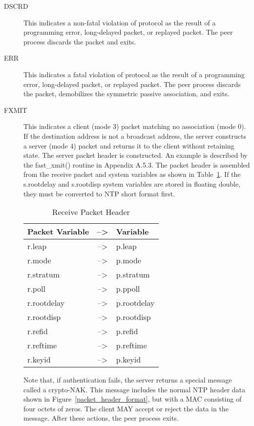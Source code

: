 \begin{description}

  \item[DSCRD] This indicates a non-fatal violation of protocol as the
    result of a programming error, long-delayed packet, or replayed
    packet. The peer process discards the packet and exits.

  \item[ERR] This indicates a fatal violation of protocol as the result of a
    programming error, long-delayed packet, or replayed packet. The peer
    process discards the packet, demobilizes the symmetric passive
    association, and exits.

  \item[FXMIT] This indicates a client (mode 3) packet matching no
    association (mode 0). If the destination address is not a broadcast
    address, the server constructs a server (mode 4) packet and returns
    it to the client without retaining state. The server packet header
    is constructed. An example is described by the fast\_xmit() routine
    in Appendix A.5.3. The packet header is assembled from the receive
    packet and system variables as shown in Table~\ref{receive_packet_header}. If the
    s.rootdelay and s.rootdisp system variables are stored in floating
    double, they must be converted to NTP short format first.

    \begin{table}[htb]
    \center
    \begin{tabular}{| l | c | l |}
    \hline
    Packet Variable & --> & Variable \\
    \hline
    \hline
    r.leap & --> & p.leap \\
    r.mode & --> & p.mode \\
    r.stratum & --> & p.stratum \\
    r.poll & --> & p.ppoll \\
    r.rootdelay & --> & p.rootdelay \\
    r.rootdisp & --> & p.rootdisp \\
    r.refid & --> & p.refid \\
    r.reftime & --> & p.reftime \\
    r.keyid & --> & p.keyid \\
    \hline
    \end{tabular}
    \caption{Receive Packet Header}
    \label{receive_packet_header}
    \end{table}

    Note that, if authentication fails, the server returns a special
    message called a crypto-NAK. This message includes the normal NTP
    header data shown in Figure~\ref{packet_header_format}, but with a MAC consisting of four
    octets of zeros. The client MAY accept or reject the data in the
    message. After these actions, the peer process exits.


\end{description}
